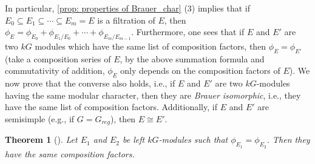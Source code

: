 \documentclass[12pt,a4paper]{report}
\newtheorem{theorem}{Theorem}[chapter]
\theoremstyle{definition}
\theoremstyle{remark}
\theoremstyle{definition}
\begin{document}
In particular, \cref{prop: properties of Brauer_char} (3) implies that if $E_0 \subseteq E_1\subseteq \cdots \subseteq E_m = E$ is a filtration of $E$, then $\phi_E = \phi_{E_0} + \phi_{E_1/E_0} + \cdots + \phi_{E_m/E_{m-1}}$. Furthermore, one sees that if $E$ and $E'$ are two $kG$ modules which have the same list of composition factors, then $\phi_E = \phi_{E'}$ (take a composition series of $E$, by the above summation formula and commutativity of addition, $\phi_E$ only depends on the composition factors of $E$). We now prove that the converse also holds, i.e., if $E$ and $E'$ are two $kG$-modules having the same modular character, then they are \emph{Brauer isomorphic}, i.e., they have the same list of composition factors. Additionally, if $E$ and $E'$ are semisimple (e.g., if $G = G_{reg}$), then $E\cong E'$.
\begin{theorem}[{\cite[Subsection 18.2, Corollary 1]{serre1977representations}}]\label{thm:main_thm_brauer}
Let $E_1$ and $E_2$ be left $kG$-modules such that $\phi_{E_1} = \phi_{E_2}$. Then they have the same composition factors.
\end{theorem}
\end{document}
